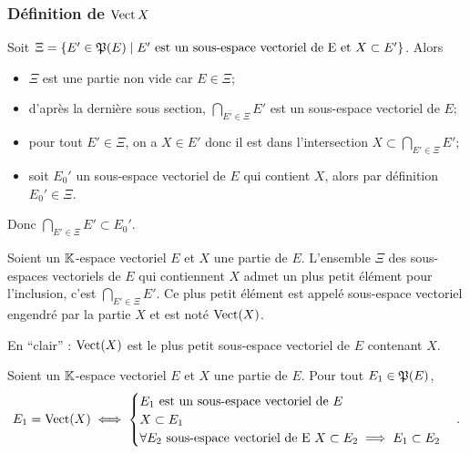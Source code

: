 \subsubsection{Définition de \(\operatorname{Vect}{X}\)}

Soit \(\Xi=\left\{E' \in \mathfrak{P}(E)\mathrel{}\middle|\mathrel{}E' \text{~est un sous-espace vectoriel de E 
et } X \subset E'\right\}\). Alors
\begin{itemize}
  \item \(\Xi\) est une partie non vide car \(E \in \Xi\);
  \item d'après la dernière sous section, \(\bigcap_{E' \in \Xi} E'\) est un 
    sous-espace vectoriel de \(E\);
  \item pour tout \(E' \in \Xi\), on a \(X \in E'\) donc il est dans 
    l'intersection \(X \subset \bigcap_{E' \in \Xi} E'\);
  \item soit \(E_0'\) un sous-espace vectoriel de \(E\) qui contient \(X\), 
    alors par définition \(E_0' \in \Xi\).
\end{itemize}

Donc \(\bigcap_{E' \in \Xi} E' \subset E_0'\).

\begin{defdef}
  Soient un \(\mathbb{K}\)-espace vectoriel \(E\) et \(X\) une partie de \(E\). 
  L'ensemble \(\Xi\) des sous-espaces vectoriels de \(E\) qui contiennent \(X\) 
  admet un plus petit élément pour l'inclusion, c'est \(\bigcap_{E' \in \Xi} 
  E'\). Ce plus petit élément est appelé sous-espace vectoriel engendré par la 
  partie \(X\) et est noté \(\operatorname{Vect}(X)\).

  En ``clair'' : \(\operatorname{Vect}(X)\) est le plus petit sous-espace vectoriel de 
  \(E\) contenant \(X\).
\end{defdef}

\begin{prop}
  Soient un \(\mathbb{K}\)-espace vectoriel \(E\) et \(X\) une partie de \(E\). Pour 
  tout \(E_1 \in \mathfrak{P}(E)\),
  \begin{equation}
    E_1 = \operatorname{Vect}(X) \iff
    \begin{cases}
      E_1 \text{~est un sous-espace vectoriel de } E \\
      X \subset E_1 \\
      \forall E_2 \text{~sous-espace vectoriel de E } X \subset E_2 \implies E_1 
      \subset E_2
    \end{cases}.
  \end{equation}
\end{prop}

